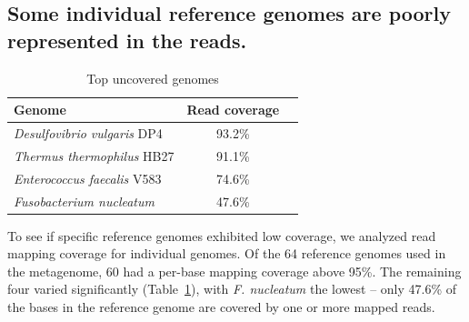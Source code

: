 \documentclass[11pt]{article}
\begin{document}
\subsection*{Some individual reference genomes are poorly represented in the reads.}


\begin{table}[!h]
\centering
\caption{Top uncovered genomes}
\begin{tabular}{|l|c|c|}\hline
\textbf{Genome} & \textbf {Read coverage} \\ \hline 

{{\em Desulfovibrio vulgaris} DP4}  & 93.2\% \\
\hline
{{\em Thermus thermophilus} HB27}  & 91.1\% \\
\hline
{{\em Enterococcus faecalis} V583}  & 74.6\% \\
\hline
{{\em Fusobacterium nucleatum}}  & 47.6\% \\
\hline
\end{tabular}
\label{table:genomes_uncovered-analysis}
\end{table}

To see if specific reference genomes exhibited low coverage, we
analyzed read mapping coverage for individual genomes.  Of the 64
reference genomes used in the metagenome, 60 had a per-base mapping
coverage above 95\%.  The remaining four varied significantly
(Table~\ref{table:genomes_uncovered-analysis}), with {\em
  F. nucleatum} the lowest -- only 47.6\% of the bases in the
reference genome are covered by one or more mapped reads.
\end{document}
